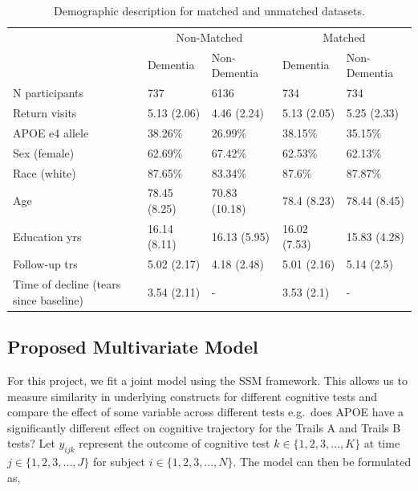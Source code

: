 \documentclass[
]{article}
\begin{document}
\begin{table}

\caption{\label{tab:unnamed-chunk-12}Demographic description for matched and unmatched datasets.}
\centering
\begin{tabular}[t]{lllll}
\toprule
\multicolumn{1}{c}{ } & \multicolumn{2}{c}{Non-Matched} & \multicolumn{2}{c}{Matched} \\
\cmidrule(l{3pt}r{3pt}){2-3} \cmidrule(l{3pt}r{3pt}){4-5}
  & Dementia & Non-Dementia & Dementia & Non-Dementia\\
\midrule
N participants & 737 & 6136 & 734 & 734\\
Return visits & 5.13 (2.06) & 4.46 (2.24) & 5.13 (2.05) & 5.25 (2.33)\\
APOE e4 allele & 38.26\% & 26.99\% & 38.15\% & 35.15\%\\
Sex (female) & 62.69\% & 67.42\% & 62.53\% & 62.13\%\\
Race (white) & 87.65\% & 83.34\% & 87.6\% & 87.87\%\\
\addlinespace
Age & 78.45 (8.25) & 70.83 (10.18) & 78.4 (8.23) & 78.44 (8.45)\\
Education yrs & 16.14 (8.11) & 16.13 (5.95) & 16.02 (7.53) & 15.83 (4.28)\\
Follow-up trs & 5.02 (2.17) & 4.18 (2.48) & 5.01 (2.16) & 5.14 (2.5)\\
Time of decline
(tears since baseline) & 3.54 (2.11) & - & 3.53 (2.1) & -\\
\bottomrule
\end{tabular}
\end{table}

\hypertarget{proposed-multivariate-model}{%
\subsection{Proposed Multivariate Model}\label{proposed-multivariate-model}}

For this project, we fit a joint model using the SSM framework. This allows us to measure similarity in underlying constructs for different cognitive tests and compare the effect of some variable across different tests e.g.~does APOE have a significantly different effect on cognitive trajectory for the Trails A and Trails B tests? Let \(y_{ijk}\) represent the outcome of cognitive test \(k\in \{1, 2, 3, ..., K\}\) at time \(j\in \{1, 2, 3, ..., J\}\) for subject \(i \in \{1, 2, 3, ..., N\}\). The model can then be formulated as,
\end{document}
